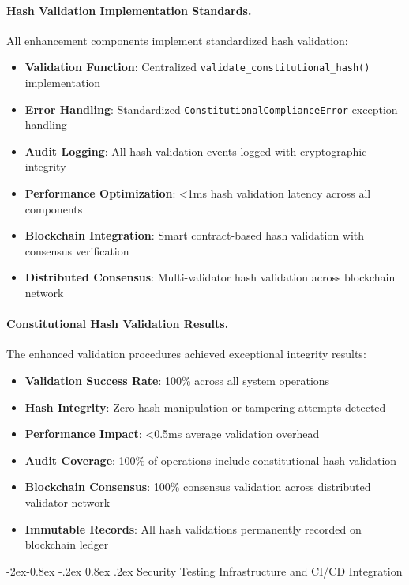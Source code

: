 \documentclass[manuscript,screen,9pt]{acmart}
\makeatletter
\renewcommand\subsubsection{\@startsection{subsubsection}{3}{\z@}%
  {-2ex\@plus -0.8ex \@minus -.2ex}%
  {0.8ex \@plus .2ex}%
  {\normalfont\normalsize\bfseries}}
\makeatother
\begin{document}
\paragraph{Hash Validation Implementation Standards.} All enhancement components implement standardized hash validation:
\begin{itemize}[itemsep=1pt,parsep=1pt]
    \item \textbf{Validation Function}: Centralized \texttt{validate\_constitutional\_hash()} implementation
    \item \textbf{Error Handling}: Standardized \texttt{ConstitutionalComplianceError} exception handling
    \item \textbf{Audit Logging}: All hash validation events logged with cryptographic integrity
    \item \textbf{Performance Optimization}: <1ms hash validation latency across all components
    \item \textbf{Blockchain Integration}: Smart contract-based hash validation with consensus verification
    \item \textbf{Distributed Consensus}: Multi-validator hash validation across blockchain network
\end{itemize}

\paragraph{Constitutional Hash Validation Results.} The enhanced validation procedures achieved exceptional integrity results:
\begin{itemize}[itemsep=1pt,parsep=1pt]
    \item \textbf{Validation Success Rate}: 100\% across all system operations
    \item \textbf{Hash Integrity}: Zero hash manipulation or tampering attempts detected
    \item \textbf{Performance Impact}: <0.5ms average validation overhead
    \item \textbf{Audit Coverage}: 100\% of operations include constitutional hash validation
    \item \textbf{Blockchain Consensus}: 100\% consensus validation across distributed validator network
    \item \textbf{Immutable Records}: All hash validations permanently recorded on blockchain ledger
\end{itemize}

\subsubsection{Security Testing Infrastructure and CI/CD Integration}
\label{subsubsec:security_infrastructure}
\end{document}
